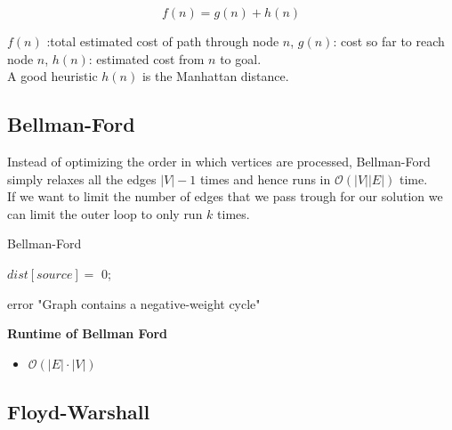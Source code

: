 \documentclass[10pt,landscape,a4paper, table]{extarticle}
\begin{document}
\begin{multicols*}{3}
$$f(n) = g(n) + h(n)$$

$f(n)$ :total estimated cost of path through node $n$,
$g(n)$: cost so far to reach node $n$,
$h(n)$: estimated cost from $n$ to goal.\\

A good heuristic $h(n)$ is the Manhattan distance. 

\subsection{Bellman-Ford}

Instead of optimizing the order in which vertices are processed, Bellman-Ford simply relaxes all the edges $|V| - 1$ times and hence runs in $\mathcal{O}(|V| |E|)$ time.\\
If we want to limit the number of edges that we pass trough for our solution we can limit the outer loop to only run $k$ times.

{\scriptsize
\begin{algorithm}[H]
    \caption{Bellman-Ford}
    \label{FWAlgorithm}
    \SetAlgoLined
    
    $dist[source] =$ 0;
    

    
    {
        {
            error "Graph contains a negative-weight cycle"
        }
    }
\end{algorithm}}
\textbf{Runtime of Bellman Ford}
\begin{itemize}
    \item $\mathcal{O}(|E| \cdot |V|) $
\end{itemize}




\subsection{Floyd-Warshall}


\end{multicols*}
\end{document}
